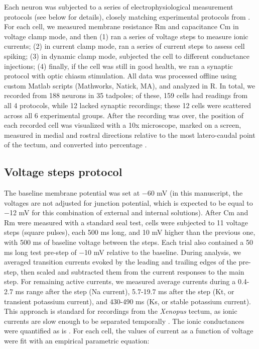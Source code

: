 \documentclass{article}
\providecommand{\DIFaddtex}[1]{{\protect\color{blue}{#1}}} %
\providecommand{\DIFaddbegin}{} %
\providecommand{\DIFaddend}{} %
\providecommand{\DIFadd}[1]{\texorpdfstring{\DIFaddtex{#1}}{#1}} %
\newcommand{\DIFaddincludegraphics}[2][]{{\color{blue}\fbox{\DIFOincludegraphics[#1]{#2}}}} %
\DeclareRobustCommand{\DIFaddbegin}{\DIFOaddbegin \let\includegraphics\DIFaddincludegraphics} %
\DeclareRobustCommand{\DIFaddend}{\DIFOaddend \let\includegraphics\DIFOincludegraphics} %
\begin{document}
Each neuron was subjected to a series of electrophysiological measurement protocols (see below for details), closely matching experimental protocols from \citep{ciarleglio2015}. For each cell, we measured membrane resistance Rm and capacitance Cm in voltage clamp mode, and then (1) ran a series of voltage steps to measure ionic currents; (2) in current clamp mode, ran a series of current steps to assess cell spiking; (3) in dynamic clamp mode, subjected the cell to different conductance injections; (4) finally, if the cell was still in good health, we ran a synaptic protocol with optic chiasm stimulation. All data was processed offline using custom Matlab scripts (Mathworks, Natick, MA), and analyzed in R. In total, we recorded from 188 neurons in 35 tadpoles; of these, 159 cells had readings from all 4 protocols, while 12 lacked synaptic recordings; these 12 cells were scattered across all 6 experimental groups. After the recording was over, the position of each recorded cell was visualized with a 10x microscope, marked on a screen, measured in medial and rostral directions relative to the most latero-caudal point of the tectum, and converted into \DIFaddbegin \DIFadd{a }\DIFaddend percentage \citep{hamodi2014}.

\subsection*{Voltage steps protocol}

The baseline membrane potential was set at $-$60 mV (in this manuscript, the voltages are not adjusted for junction potential, which is expected to be equal to $-$12 mV for this combination of external and internal solutions). After Cm and Rm were measured with a standard seal test, cells were subjected to 11 voltage steps (square pulses), each 500 ms long, and 10 mV higher than the previous one, with 500 ms of baseline voltage between the steps. Each trial also contained a 50 ms long test pre-step of $-$10 mV relative to the baseline. During analysis, we averaged transition currents evoked by the leading and trailing edges of the pre-step, then scaled and subtracted them from the current responses to the main step. For remaining active currents, we measured average currents during a 0.4-2.7 ms range after the step (Na current), 5.7-19.7 ms after the step (Kt, or transient potassium current), and 430-490 ms (Ks, or stable potassium current). This approach is standard for recordings from the \textit{Xenopus} tectum, as ionic currents are slow enough to be separated temporally \citep{aizenman2003}. The ionic conductances were quantified as is \citep{ciarleglio2015}. For each cell, the values of current as a function of voltage were fit with an empirical parametric equation:
\end{document}
